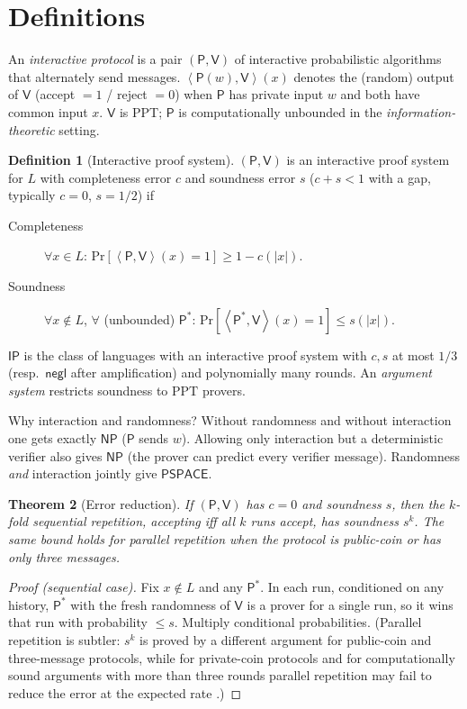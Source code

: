 \documentclass[11pt,a4paper]{report}
\theoremstyle{plain}
\newtheorem{theorem}{Theorem}[chapter]
\theoremstyle{definition}
\newtheorem{definition}[theorem]{Definition}
\theoremstyle{remark}
\newcommand{\negl}{\mathsf{negl}}
\newcommand{\PPT}{\mathrm{PPT}}
\renewcommand{\Pr}{\mathrm{Pr}}
\newcommand{\Prv}{\mathsf{P}}\newcommand{\Ver}{\mathsf{V}}
\newcommand{\NP}{\mathsf{NP}}\newcommand{\BPP}{\mathsf{BPP}}\newcommand{\IP}{\mathsf{IP}}
\newcommand{\PSPACE}{\mathsf{PSPACE}}\newcommand{\AM}{\mathsf{AM}}\newcommand{\coAM}{\mathsf{coAM}}
\newcommand{\pair}[2]{\left\langle #1,#2\right\rangle}
\begin{document}
\section{Definitions}
An \emph{interactive protocol} is a pair $(\Prv,\Ver)$ of interactive probabilistic algorithms that alternately send messages. $\pair{\Prv(w)}{\Ver}(x)$ denotes the (random) output of $\Ver$ (accept $=1$ / reject $=0$) when $\Prv$ has private input $w$ and both have common input $x$. $\Ver$ is PPT; $\Prv$ is computationally unbounded in the \emph{information-theoretic} setting.
\begin{definition}[Interactive proof system]\label{def:ip}
$(\Prv,\Ver)$ is an interactive proof system for $L$ with completeness error $c$ and soundness error $s$ ($c+s<1$ with a gap, typically $c=0$, $s=1/2$) if
\begin{description}
\item[Completeness] $\forall x\in L$: $\Pr[\pair{\Prv}{\Ver}(x)=1]\ge1-c(|x|)$.
\item[Soundness] $\forall x\notin L$, $\forall$ (unbounded) $\Prv^*$: $\Pr[\pair{\Prv^*}{\Ver}(x)=1]\le s(|x|)$.
\end{description}
$\IP$ is the class of languages with an interactive proof system with $c,s$ at most $1/3$ (resp.\ $\negl$ after amplification) and polynomially many rounds. An \emph{argument system} restricts soundness to $\PPT$ provers.
\end{definition}
Why interaction and randomness? Without randomness and without interaction one gets exactly $\NP$ ($\Prv$ sends $w$). Allowing only interaction but a deterministic verifier also gives $\NP$ (the prover can predict every verifier message). Randomness \emph{and} interaction jointly give $\PSPACE$.

\begin{theorem}[Error reduction]\label{thm:errred}
If $(\Prv,\Ver)$ has $c=0$ and soundness $s$, then the $k$-fold \emph{sequential} repetition, accepting iff all $k$ runs accept, has soundness $s^k$. The same bound holds for \emph{parallel} repetition when the protocol is public-coin or has only three messages.
\end{theorem}
\begin{proof}[Proof (sequential case)]
Fix $x\notin L$ and any $\Prv^*$. In each run, conditioned on any history, $\Prv^*$ with the fresh randomness of $\Ver$ is a prover for a single run, so it wins that run with probability $\le s$. Multiply conditional probabilities. (Parallel repetition is subtler: $s^k$ is proved by a different argument for public-coin and three-message protocols, while for private-coin protocols and for computationally sound arguments with more than three rounds parallel repetition may fail to reduce the error at the expected rate \cite{BIN97}.)
\end{proof}
\end{document}
